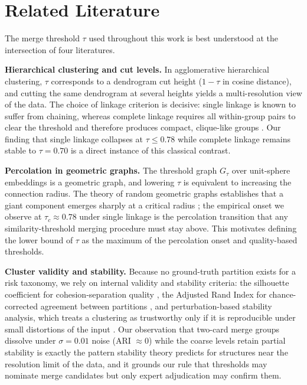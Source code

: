 \documentclass[11pt,a4paper]{article}
\begin{document}
\section{Related Literature}

The merge threshold $\tau$ used throughout this work is best understood at the intersection of four literatures.

\textbf{Hierarchical clustering and cut levels.} In agglomerative hierarchical clustering, $\tau$ corresponds to a dendrogram cut height ($1-\tau$ in cosine distance), and cutting the same dendrogram at several heights yields a multi-resolution view of the data. The choice of linkage criterion is decisive: single linkage is known to suffer from chaining, whereas complete linkage requires all within-group pairs to clear the threshold and therefore produces compact, clique-like groups \cite{murtagh2012}. Our finding that single linkage collapses at $\tau \leq 0.78$ while complete linkage remains stable to $\tau=0.70$ is a direct instance of this classical contrast.

\textbf{Percolation in geometric graphs.} The threshold graph $G_\tau$ over unit-sphere embeddings is a geometric graph, and lowering $\tau$ is equivalent to increasing the connection radius. The theory of random geometric graphs establishes that a giant component emerges sharply at a critical radius \cite{penrose2003}; the empirical onset we observe at $\tau_c \approx 0.78$ under single linkage is the percolation transition that any similarity-threshold merging procedure must stay above. This motivates defining the lower bound of $\tau$ as the maximum of the percolation onset and quality-based thresholds.

\textbf{Cluster validity and stability.} Because no ground-truth partition exists for a risk taxonomy, we rely on internal validity and stability criteria: the silhouette coefficient for cohesion-separation quality \cite{rousseeuw1987}, the Adjusted Rand Index for chance-corrected agreement between partitions \cite{hubert1985}, and perturbation-based stability analysis, which treats a clustering as trustworthy only if it is reproducible under small distortions of the input \cite{vonluxburg2010}. Our observation that two-card merge groups dissolve under $\sigma=0.01$ noise (ARI $\approx 0$) while the coarse levels retain partial stability is exactly the pattern stability theory predicts for structures near the resolution limit of the data, and it grounds our rule that thresholds may nominate merge candidates but only expert adjudication may confirm them.
\end{document}
